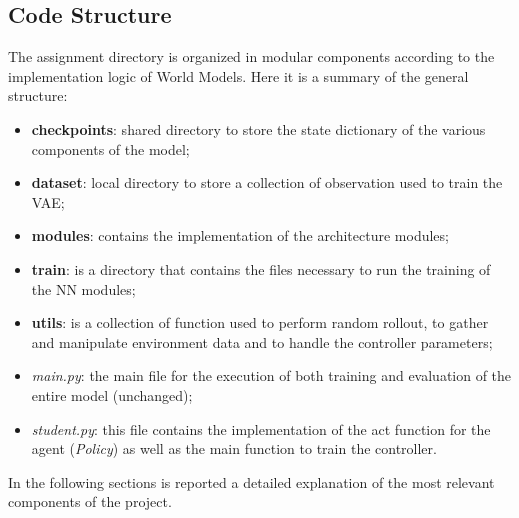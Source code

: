 \documentclass[10pt,a4paper]{article}
\begin{document}
\subsection{Code Structure}
The assignment directory is organized in modular components according to the implementation logic of World Models. Here it is a summary of the general structure:
\begin{itemize}
    \item \textbf{checkpoints}: shared directory to store the state dictionary of the various components of the model;
    \item \textbf{dataset}: local directory to store a collection of observation used to train the VAE;
    \item \textbf{modules}: contains the implementation of the architecture modules;
    \item \textbf{train}: is a directory that contains the files necessary to run the training of the NN modules;
    \item \textbf{utils}: is a collection of function used to perform random rollout, to gather and manipulate environment data and to handle the controller parameters;
    \item \textit{main.py}: the main file for the execution of both training and evaluation of the entire model (unchanged);
    \item \textit{student.py}: this file contains the implementation of the act function for the agent (\textit{Policy}) as well as the main function to train the controller.
\end{itemize}
In the following sections is reported a detailed explanation of the most relevant components of the project.
\end{document}
